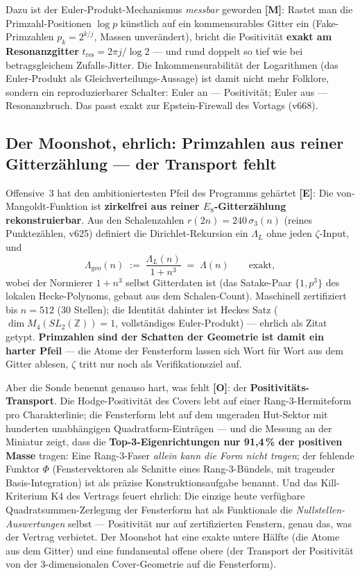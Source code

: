 \documentclass[11pt,a4paper]{article}
\newcommand{\E}{\textcolor{gut}{\textbf{[E]}}}
\newcommand{\OO}{\textcolor{offen}{\textbf{[O]}}}
\newcommand{\M}{\textcolor{mess}{\textbf{[M]}}}
\begin{document}
Dazu ist der Euler-Produkt-Mechanismus \emph{messbar} geworden \M{}:
Rastet man die Primzahl-Positionen $\log p$ künstlich auf ein
kommensurables Gitter ein (\glqq{}Fake-Primzahlen\grqq{}
$p_k = 2^{k/j}$, Massen unverändert), bricht die Positivität
\textbf{exakt am Resonanzgitter} $t_{\mathrm{res}} = 2\pi j/\log 2$
--- und rund doppelt so tief wie bei betragsgleichem
Zufalls-Jitter. Die Inkommensurabilität der Logarithmen (das
Euler-Produkt als Gleichverteilungs-Aussage) ist damit nicht mehr
Folklore, sondern ein reproduzierbarer Schalter: Euler an ---
Positivität; Euler aus --- Resonanzbruch. Das passt exakt zur
Epstein-Firewall des Vortags (v668).

\subsection*{Der Moonshot, ehrlich: Primzahlen aus reiner
Gitterzählung --- der Transport fehlt}

Offensive~3 hat den ambitioniertesten Pfeil des Programms gehärtet
\E{}: Die von-Mangoldt-Funktion ist \textbf{zirkelfrei aus reiner
$E_8$-Gitterzählung rekonstruierbar}. Aus den Schalenzahlen $r(2n) =
240\,\sigma_3(n)$ (reines Punktezählen, v625) definiert die
Dirichlet-Rekursion ein $\Lambda_L$ ohne jeden $\zeta$-Input, und
\[
\Lambda_{\mathrm{geo}}(n) \;:=\; \frac{\Lambda_L(n)}{1 + n^3}
\;=\; \Lambda(n) \qquad \text{exakt},
\]
wobei der Normierer $1 + n^3$ selbst Gitterdaten ist (das
Satake-Paar $\{1, p^3\}$ des lokalen Hecke-Polynoms, gebaut aus dem
Schalen-Count). Maschinell zertifiziert bis $n = 512$ (30 Stellen);
die Identität dahinter ist Heckes Satz ($\dim M_4(SL_2(\mathbb{Z}))
= 1$, vollständiges Euler-Produkt) --- ehrlich als Zitat getypt.
\textbf{\glqq{}Primzahlen sind der Schatten der Geometrie\grqq{} ist
damit ein harter Pfeil} --- die Atome der Fensterform lassen sich
Wort für Wort aus dem Gitter ablesen, $\zeta$ tritt nur noch als
Verifikationsziel auf.

Aber die Sonde benennt genauso hart, was fehlt \OO{}: der
\textbf{Positivitäts-Transport}. Die Hodge-Positivität des Covers
lebt auf einer Rang-3-Hermiteform pro Charakterlinie; die
Fensterform lebt auf dem ungeraden Hut-Sektor mit hunderten
unabhängigen Quadratform-Einträgen --- und die Messung an der
Miniatur zeigt, dass die \textbf{Top-3-Eigenrichtungen nur
91{,}4\,\% der positiven Masse} tragen: Eine Rang-3-Faser
\emph{allein kann die Form nicht tragen}; der fehlende Funktor
$\Phi$ (Fenstervektoren als Schnitte eines Rang-3-Bündels, mit
tragender Basis-Integration) ist als präzise Konstruktionsaufgabe
benannt. Und das Kill-Kriterium K4 des Vertrags feuert ehrlich: Die
einzige heute verfügbare Quadratsummen-Zerlegung der Fensterform hat
als Funktionale die \emph{Nullstellen-Auswertungen} selbst ---
Positivität nur auf zertifizierten Fenstern, genau das, was der
Vertrag verbietet. Der Moonshot hat eine exakte untere Hälfte
(die Atome aus dem Gitter) und eine fundamental offene obere
(der Transport der Positivität von der 3-dimensionalen
Cover-Geometrie auf die Fensterform).
\end{document}
